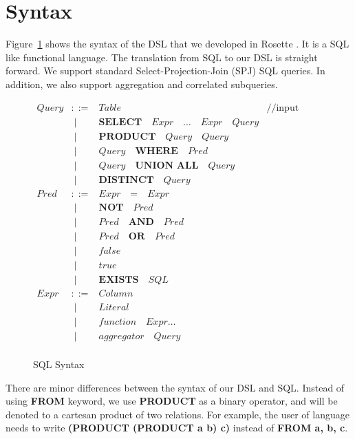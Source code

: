\section{Syntax}

Figure~\ref{tab:sql-syntax} shows the syntax of the DSL that we developed
in Rosette \cite{rosette}. It is a SQL like functional language. The 
translation from SQL to our DSL is straight forward. We support standard
Select-Projection-Join (SPJ) SQL queries. In addition, we also support 
aggregation and correlated subqueries. 

\begin{figure}[t]
\centering
\[
\begin{array}{llll}
  Query & ::=  &  Table & \text{//input table} \\
        & \; \mid & \textbf{SELECT} \quad Expr \quad \ldots \quad Expr \quad  Query      \\ 
        & \; \mid  & \textbf{PRODUCT} \quad Query \quad Query        \\
        & \; \mid & Query \quad \textbf{WHERE} \quad Pred        \\
        & \; \mid & Query \quad \textbf{UNION ALL} \quad Query   \\
        & \; \mid & \textbf{DISTINCT} \quad Query                \\
  Pred & ::= & Expr \quad \textbf{=} \quad Expr \\
       & \; \mid &  \textbf{NOT} \quad Pred      \\
       & \; \mid & Pred \quad \textbf{AND} \quad Pred      \\ 
       & \; \mid & Pred \quad \textbf{OR} \quad Pred \\
       & \; \mid & false \\
       & \; \mid & true  \\
       & \; \mid & \textbf{EXISTS} \quad SQL \\
  Expr & ::= & Column                     \\
        & \; \mid & Literal                  \\
        & \; \mid & function \quad Expr \ldots     \\
        & \; \mid & aggregator \quad Query   \\  
\end{array}
\]
\caption{SQL Syntax}
\label{tab:sql-syntax}
\end{figure}

There are minor differences between the syntax of our DSL and SQL. Instead of using \textbf{FROM} keyword, we use \textbf{PRODUCT} as 
a binary operator, and will be denoted to a cartesan product of 
two relations. For example, the user of language needs to write 
\textbf{(PRODUCT (PRODUCT a b) c)} instead of \textbf{FROM a, b, c}.  

